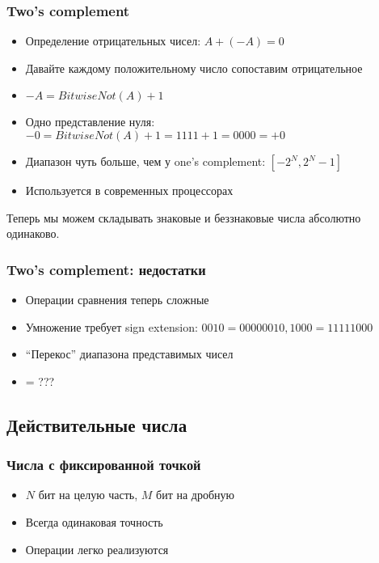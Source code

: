   \subsubsection{Two's complement}
    \begin{itemize}
      \item Определение отрицательных чисел: $A + (-A) = 0$
      \item Давайте каждому положительному число сопоставим отрицательное
      \item $-A = BitwiseNot(A) + 1$
      \item Одно представление нуля: $-0 = BitwiseNot(A) + 1 = 1111 + 1 = 0000 = +0$
      \item Диапазон чуть больше, чем у one's complement: $[-2^N, 2^N - 1]$
      \item Используется в современных процессорах
    \end{itemize}
    
    Теперь мы можем складывать знаковые и беззнаковые числа абсолютно одинаково.
  
  \subsubsection*{Two's complement: недостатки}
    \begin{itemize}
      \item Операции сравнения теперь сложные
      \item Умножение требует sign extension: $0010 = 00000010, 1000 = 11111000$
      \item ``Перекос'' диапазона представимых чисел
      \item {} = ???
    \end{itemize}
  
  \subsection{Действительные числа}
  \subsubsection{Числа с фиксированной точкой}
    \begin{itemize}
      \item $N$ бит на целую часть, $M$ бит на дробную
      \item Всегда одинаковая точность
      \item Операции легко реализуются
    \end{itemize}
  
